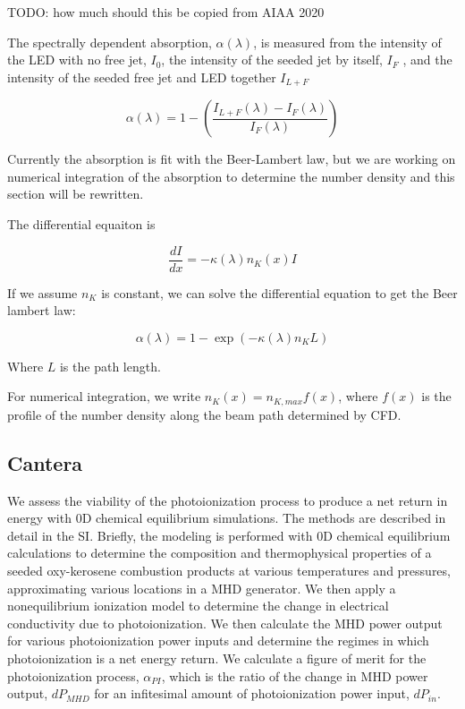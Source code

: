 TODO: how much should this be copied from AIAA 2020

The spectrally dependent absorption, $\alpha(\lambda)$, is measured from the intensity of the LED with no free jet, $I_0$, the intensity
of the seeded jet by itself, $I_F$ , and the intensity of the seeded free jet and LED together $I_{L+F}$


\begin{equation}
    \alpha(\lambda) = 1 - \left(\frac{I_{L+F}(\lambda) - I_{F}(\lambda)}{I_F(\lambda)}\right)
\end{equation}

Currently the absorption is fit with the Beer-Lambert law, but we are working on numerical integration of the absorption to determine the number density and this section will be rewritten. 

The differential equaiton is 

\begin{equation}
    \frac{dI}{dx} = -\kappa(\lambda) n_K(x) I
\end{equation}

If we assume $n_K$ is constant, we can solve the differential equation to get the Beer lambert law:

\begin{equation}
    \alpha(\lambda) = 1 - \exp(-\kappa(\lambda) n_K L)
\end{equation}

Where $L$ is the path length.

For numerical integration, we write $n_K(x) = n_{K,max} f(x)$, where $f(x)$ is the profile of the number density along the beam path determined by CFD. 




\subsection{Cantera}

We assess the viability of the photoionization process to produce a net return in energy with 0D chemical equilibrium simulations. The methods are described in detail in the SI. Briefly, the modeling is performed with 0D chemical equilibrium calculations to determine the composition and thermophysical properties of a seeded oxy-kerosene combustion products at various temperatures and pressures, approximating various locations in a MHD generator. We then apply a nonequilibrium ionization model to determine the change in electrical conductivity due to photoionization. We then calculate the MHD power output for various photoionization power inputs and determine the regimes in which photoionization is a net energy return. We calculate a figure of merit for the photoionization process, $\alpha_{PI}$, which is the ratio of the change in MHD power output, $dP_{MHD}$ for an infitesimal amount of photoionization power input, $dP_{in}$. 


